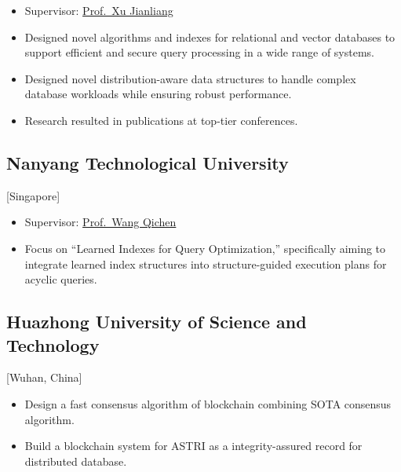 \documentclass{mycv}
\begin{document}
\begin{itemize}
  \item Supervisor: \href{https://www.comp.hkbu.edu.hk/~xujl}{Prof.~Xu Jianliang}
  \item Designed novel algorithms and indexes for relational and vector databases to support efficient and secure query processing in a wide range of systems.
  \item Designed novel distribution-aware data structures to handle complex database workloads while ensuring robust performance.
  \item Research resulted in publications at top-tier conferences.
\end{itemize}

\subsection{Nanyang Technological University}[Singapore]
\begin{positions}
\end{positions}
\begin{itemize}
  \item Supervisor: \href{https://qichen-wang.github.io}{Prof.~Wang Qichen}
  \item Focus on ``Learned Indexes for Query Optimization,'' specifically aiming to integrate learned index structures into structure-guided execution plans for acyclic queries.
\end{itemize}

\subsection{Huazhong University of Science and Technology}[Wuhan, China]
\begin{positions}
\end{positions}

\begin{itemize}
  \item Design a fast consensus algorithm of blockchain combining SOTA consensus algorithm.
  \item Build a blockchain system for ASTRI as a integrity-assured record for distributed database.
\end{itemize}

\end{document}
